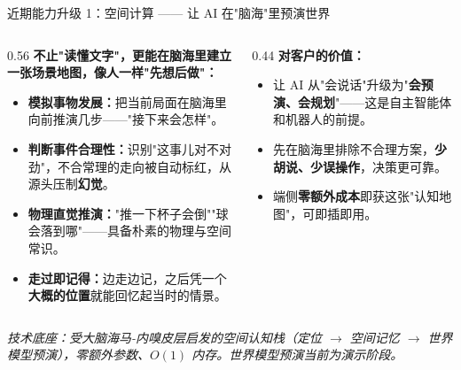 ﻿\documentclass[aspectratio=169, 10pt]{beamer}
\begin{document}
\begin{frame}{近期能力升级 1：空间计算 —— 让 AI 在"脑海"里预演世界}
\small
\begin{columns}
\begin{column}{0.56\textwidth}
\textbf{不止"读懂文字"，更能在脑海里建立一张场景地图，像人一样"先想后做"：}
\begin{itemize}\itemsep=0.3em
    \item \textbf{模拟事物发展：}把当前局面在脑海里向前推演几步——"接下来会怎样"。
    \item \textbf{判断事件合理性：}识别"这事儿对不对劲"，不合常理的走向被自动标红，从源头压制\textbf{幻觉}。
    \item \textbf{物理直觉推演：}"推一下杯子会倒""球会落到哪"——具备朴素的物理与空间常识。
    \item \textbf{走过即记得：}边走边记，之后凭一个\textbf{大概的位置}就能回忆起当时的情景。
\end{itemize}
\end{column}
\begin{column}{0.44\textwidth}
\textbf{对客户的价值：}
\begin{itemize}\itemsep=0.3em
    \item 让 AI 从"会说话"升级为"\textbf{会预演、会规划}"——这是自主智能体和机器人的前提。
    \item 先在脑海里排除不合理方案，\textbf{少胡说、少误操作}，决策更可靠。
    \item 端侧\textbf{零额外成本}即获这张"认知地图"，可即插即用。
\end{itemize}
\end{column}
\end{columns}
\vspace{0.3em}
{\footnotesize\itshape 技术底座：受大脑海马-内嗅皮层启发的空间认知栈（定位 $\rightarrow$ 空间记忆 $\rightarrow$ 世界模型预演），零额外参数、$O(1)$ 内存。世界模型预演当前为演示阶段。}
\end{frame}
\end{document}
